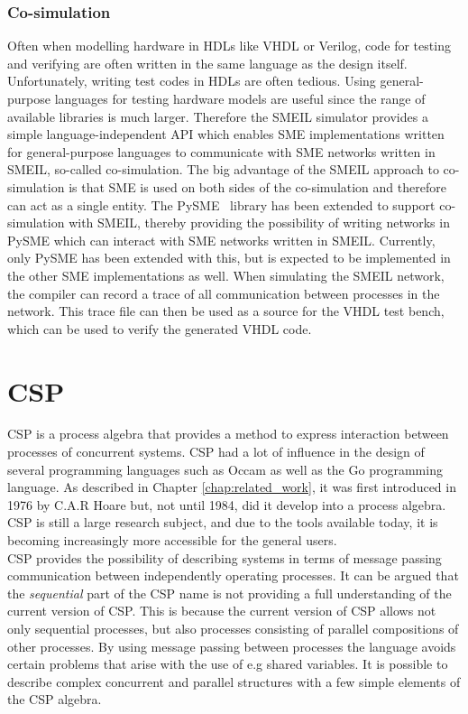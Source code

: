 \subsubsection{Co-simulation}
Often when modelling hardware in HDLs like VHDL or Verilog, code for testing and verifying are often written in the same language as the design itself. Unfortunately, writing test codes in HDLs are often tedious. Using general-purpose languages for testing hardware models are useful since the range of available libraries is much larger.
Therefore the SMEIL simulator provides a simple language-independent API which enables SME implementations written for general-purpose languages to communicate with SME networks written in SMEIL, so-called co-simulation.
The big advantage of the SMEIL approach to co-simulation is that SME is used on both sides of the co-simulation and therefore can act as a single entity.
The PySME~\cite{pysme} library has been extended to support co-simulation with SMEIL, thereby providing the possibility of writing networks in PySME which can interact with SME networks written in SMEIL. Currently, only PySME has been extended with this, but is expected to be implemented in the other SME implementations as well.
When simulating the SMEIL network, the compiler can record a trace of all communication between processes in the network. This trace file can then be used as a source for the VHDL test bench, which can be used to verify the generated VHDL code.
\section{CSP}
\label{sec:csp_background}
CSP is a process algebra that provides a method to express interaction between processes of concurrent systems.
CSP had a lot of influence in the design of several programming languages such as Occam as well as the Go programming language.
As described in Chapter \ref{chap:related_work}, it was first introduced in 1976 by C.A.R Hoare but, not until 1984, did it develop into a process algebra. CSP is still a large research subject, and due to the tools available today, it is becoming increasingly more accessible for the general users.\\

CSP provides the possibility of describing systems in terms of message passing communication between independently operating processes. It can be argued that the \textit{sequential} part of the CSP name is not providing a full understanding of the current version of CSP. This is because the current version of CSP allows not only sequential processes, but also processes consisting of parallel compositions of other processes.
By using message passing between processes the language avoids certain problems that arise with the use of e.g shared variables.
It is possible to describe complex concurrent and parallel structures with a few simple elements of the CSP algebra.\\

